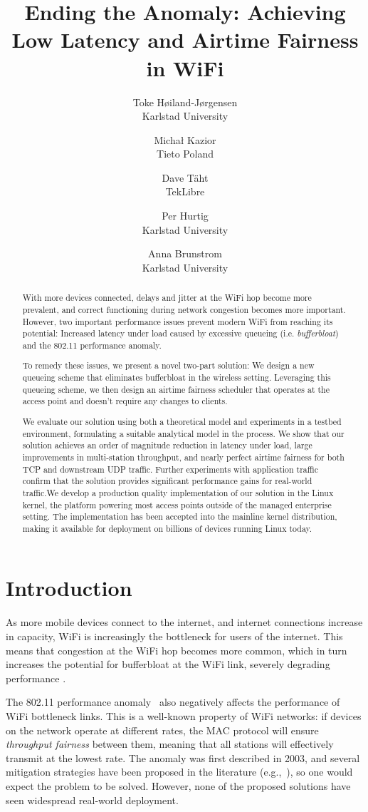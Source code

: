 \documentclass[english]{scrartcl}
\author{
{\upshape Toke Høiland-Jørgensen}\\
Karlstad University
\and
{\upshape Michał Kazior}\\
Tieto Poland
\and
{\upshape Dave Täht}\\
TekLibre
\and
{\upshape Per Hurtig}\\
Karlstad University
\and
{\upshape Anna Brunstrom}\\
Karlstad University}
\date{}
\title{Ending the Anomaly: Achieving Low Latency and Airtime Fairness in WiFi}
\begin{document}
\maketitle
\begin{abstract}
With more devices connected, delays and jitter at the WiFi hop become more
prevalent, and correct functioning during network congestion becomes more
important. However, two important performance issues prevent modern WiFi from
reaching its potential: Increased latency under load caused by excessive
queueing (i.e. \emph{bufferbloat}) and the 802.11 performance anomaly.

To remedy these issues, we present a novel two-part solution: We design a new
queueing scheme that eliminates bufferbloat in the wireless setting. Leveraging
this queueing scheme, we then design an airtime fairness scheduler that operates
at the access point and doesn't require any changes to clients.

We evaluate our solution using both a theoretical model and experiments in a
testbed environment, formulating a suitable analytical model in the process. We
show that our solution achieves an order of magnitude reduction in latency under
load, large improvements in multi-station throughput, and nearly perfect airtime
fairness for both TCP and downstream UDP traffic. Further experiments with
application traffic confirm that the solution provides significant performance
gains for real-world traffic.We develop a production quality implementation of
our solution in the Linux kernel, the platform powering most access points
outside of the managed enterprise setting. The implementation has been accepted
into the mainline kernel distribution, making it available for deployment on
billions of devices running Linux today.
\end{abstract}

\section{Introduction}
\label{sec:org0d29e57}
As more mobile devices connect to the internet, and internet connections
increase in capacity, WiFi is increasingly the bottleneck for users of the
internet. This means that congestion at the WiFi hop becomes more common, which
in turn increases the potential for bufferbloat at the WiFi link, severely
degrading performance \cite{good-bad-wifi}.

The 802.11 performance anomaly \cite{heusse_performance_2003} also
negatively affects the performance of WiFi bottleneck links. This is a
well-known property of WiFi networks: if devices on the network operate at
different rates, the MAC protocol will ensure \emph{throughput fairness} between
them, meaning that all stations will effectively transmit at the lowest rate.
The anomaly was first described in 2003, and several mitigation strategies have
been proposed in the literature
(e.g., \cite{tan_time-based_2004,joshi_airtime_2008}), so one would expect the
problem to be solved. However, none of the proposed solutions have seen
widespread real-world deployment.
\end{document}
